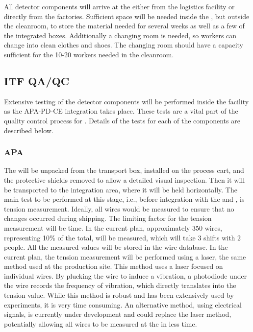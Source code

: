 All detector  components will arrive at the  either from the logistics facility or directly from the factories. Sufficient space will be needed inside the , but outside the cleanroom, to store the material needed for several weeks as well as a few of the integrated  boxes. Additionally a changing room is needed, so workers can change into clean clothes and shoes. The changing room should have a capacity sufficient for the 10-20 workers needed in the cleanroom. 

\subsection{ITF QA/QC}
\label{sec:fdsp-tc-itf-qaqc}
Extensive testing of the detector components will be performed inside the  facility as the APA-PD-CE integration takes place. These tests are a vital part of the quality control process for . Details of the tests for each of the components are described below.

\subsubsection{APA}
The  will be unpacked from the transport box, installed on the process cart, and the protective shields removed to allow a detailed visual inspection. Then it will be transported to the integration area, where it will be held horizontally. The main test to be performed at this stage, i.e., before integration with the  and , is tension measurement. Ideally, all wires would be measured to ensure that no changes occurred during shipping. The limiting factor for the tension measurement will be time. In the current plan, approximately 350 wires, representing 10$\%$ of the total, will be measured, which will take 3 shifts with 2 people. All the measured values will be stored in the wire  database. In the current plan, the tension measurement will be performed using a laser, the same method used at the production site. This method uses a laser focused on individual wires. By plucking the wire to induce a vibration, a photodiode under the wire records the frequency of vibration, which directly translates into the tension value. While this method is robust and has been extensively used by  experiments, it is very time consuming. An alternative method, using electrical signals, is currently under development and could replace the laser method, potentially allowing all  wires to be measured at the  in less time.

